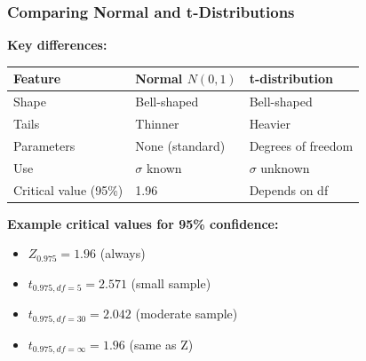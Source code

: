 \documentclass{beamer}
\begin{document}
\begin{frame}
\frametitle{Comparing Normal and t-Distributions}
\textbf{Key differences:}

\vspace{0.3cm}
\begin{center}
\begin{tabular}{lll}
\toprule
Feature & Normal $N(0,1)$ & t-distribution \\
\midrule
Shape & Bell-shaped & Bell-shaped \\
Tails & Thinner & Heavier \\
Parameters & None (standard) & Degrees of freedom \\
Use & $\sigma$ known & $\sigma$ unknown \\
Critical value (95\%) & 1.96 & Depends on df \\
\bottomrule
\end{tabular}
\end{center}

\vspace{0.5cm}
\textbf{Example critical values for 95\% confidence:}
\begin{itemize}
\item $Z_{0.975} = 1.96$ (always)
\item $t_{0.975, df=5} = 2.571$ (small sample)
\item $t_{0.975, df=30} = 2.042$ (moderate sample)
\item $t_{0.975, df=\infty} = 1.96$ (same as Z)
\end{itemize}
\end{frame}
\end{document}
